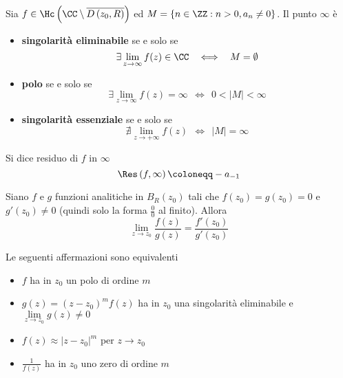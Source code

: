 \begin{thm}
Sia $f\in \Hc \left(\CC \setminus \overline{D\left(z_{0}, R\right)}\right)$ ed $M = \left\{n\in \ZZ :n > 0, a_{n} \neq 0\right\}$. Il punto $\infty $ è

\begin{itemize}
\item \textbf{singolarità eliminabile} se e solo se
\begin{equation*}
\exists \lim\limits_{z\rightarrow \infty} f(z) \in \CC \ \ \iff \ \ M = \emptyset
\end{equation*}
\item \textbf{polo} se e solo se
\begin{equation*}
\exists \lim\limits_{z\rightarrow \infty} f(z) = \infty \ \ \iff \ \ 0 < \left| M\right| < \infty
\end{equation*}
\item \textbf{singolarità essenziale} se e solo se
\begin{equation*}
\nexists \lim\limits_{z\rightarrow + \infty} f(z) \ \ \iff \ \ \left| M\right| = \infty
\end{equation*}
\end{itemize}
\end{thm}
\begin{defn}
Si dice residuo di $f$ in $\infty $
\begin{equation*}
\Res \left(f, \infty \right) \coloneqq - a_{- 1}
\end{equation*}
\end{defn}
\begin{thm}
[di De l'Hôpital] Siano $f$ e $g$ funzioni analitiche in $B_{R}\left(z_{0}\right)$ tali che $f\left(z_{0}\right) = g\left(z_{0}\right) = 0$ e $g'\left(z_{0}\right) \neq 0$ (quindi solo la forma $\frac{0}{0}$ al finito). Allora
\begin{equation*}
\lim\limits_{z\rightarrow z_{0}}\frac{f(z)}{g(z)} = \frac{f'\left(z_{0}\right)}{g'\left(z_{0}\right)}
\end{equation*}
\end{thm}
\begin{thm}
Le seguenti affermazioni sono equivalenti
\begin{itemize}
\item $f$ ha in $z_{0}$ un polo di ordine $m$
\item $g(z) = \left(z - z_{0}\right)^{m} f(z)$ ha in $z_{0}$ una singolarità eliminabile e $\lim\limits_{z\rightarrow z_{0}} g(z) \neq 0$
\item $f(z) \approx \left| z - z_{0}\right|^{m}$ per $z\rightarrow z_{0}$
\item $\frac{1}{f(z)}$ ha in $z_{0}$ uno zero di ordine $m$
\end{itemize}
\end{thm}
